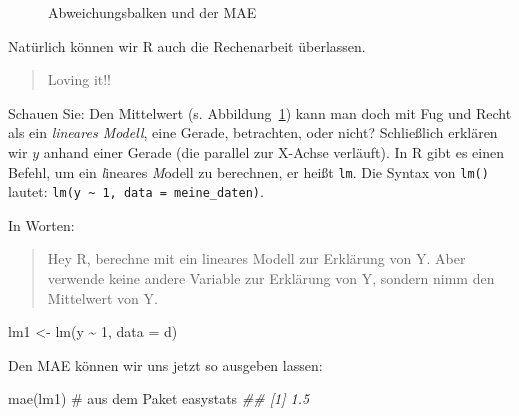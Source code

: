 \documentclass[
  letterpaper,
  twoside,
  open=any]{scrbook}
\newenvironment{Shaded}{\begin{snugshade}}{\end{snugshade}}
\newcommand{\AttributeTok}[1]{\textcolor[rgb]{0.40,0.45,0.13}{#1}}
\newcommand{\CommentTok}[1]{\textcolor[rgb]{0.37,0.37,0.37}{#1}}
\newcommand{\DecValTok}[1]{\textcolor[rgb]{0.68,0.00,0.00}{#1}}
\newcommand{\DocumentationTok}[1]{\textcolor[rgb]{0.37,0.37,0.37}{\textit{#1}}}
\newcommand{\FunctionTok}[1]{\textcolor[rgb]{0.28,0.35,0.67}{#1}}
\newcommand{\NormalTok}[1]{\textcolor[rgb]{0.00,0.23,0.31}{#1}}
\newcommand{\OtherTok}[1]{\textcolor[rgb]{0.00,0.23,0.31}{#1}}
\newcommand{\SpecialCharTok}[1]{\textcolor[rgb]{0.37,0.37,0.37}{#1}}
\theoremstyle{definition}
\theoremstyle{definition}
\theoremstyle{definition}
\theoremstyle{remark}
\begin{document}
\begin{figure}


\caption{\label{fig-mae}Abweichungsbalken und der MAE}

\end{figure}%

Natürlich können wir R auch die Rechenarbeit überlassen.

\begin{quote}
{} Loving it!!
\end{quote}

Schauen Sie: Den Mittelwert (s. Abbildung~\ref{fig-mae}) kann man doch
mit Fug und Recht als ein \emph{lineares Modell}, eine Gerade,
betrachten, oder nicht? Schließlich erklären wir \(y\) anhand einer
Gerade (die parallel zur X-Achse verläuft). In R gibt es einen Befehl,
um ein \emph{l}ineares \emph{M}odell zu berechnen, er heißt \texttt{lm}.
Die Syntax von \texttt{lm()} lautet:
\texttt{lm(y\ \textasciitilde{}\ 1,\ data\ =\ meine\_daten)}.

In Worten:

\begin{quote}
Hey R, berechne mit ein lineares Modell zur Erklärung von Y. Aber
verwende keine andere Variable zur Erklärung von Y, sondern nimm den
Mittelwert von Y.
\end{quote}

\begin{Shaded}
\begin{Highlighting}[]
\NormalTok{lm1 }\OtherTok{\textless{}{-}} \FunctionTok{lm}\NormalTok{(y }\SpecialCharTok{\textasciitilde{}} \DecValTok{1}\NormalTok{, }\AttributeTok{data =}\NormalTok{ d)}
\end{Highlighting}
\end{Shaded}

Den MAE können wir uns jetzt so ausgeben lassen:

\begin{Shaded}
\begin{Highlighting}[]
\FunctionTok{mae}\NormalTok{(lm1)  }\CommentTok{\# aus dem Paket easystats}
\DocumentationTok{\#\# [1] 1.5}
\end{Highlighting}
\end{Shaded}
\end{document}
